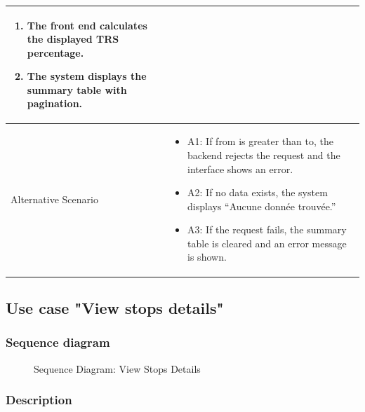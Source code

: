 {\begin{longtable}{|p{}|p{}|}
\begin{enumerate}
\item The front end calculates the displayed TRS percentage.
\item The system displays the summary table with pagination.
\end{enumerate} \\ \hline
Alternative Scenario &
\begin{itemize}
\item A1: If from is greater than to, the backend rejects the request and the interface shows an error.
\item A2: If no data exists, the system displays ``Aucune donnée trouvée.''
\item A3: If the request fails, the summary table is cleared and an error message is shown.
\end{itemize} \\ \hline
\end{longtable}
}

\subsection{Use case "View stops details"}

\subsubsection{Sequence diagram}

\begin{figure}[H]
\centering
{}
\caption{Sequence Diagram: View Stops Details}
\label{fig:chapter2-view-stops-details}
\end{figure}
\vspace{3cm}
\subsubsection{Description}

